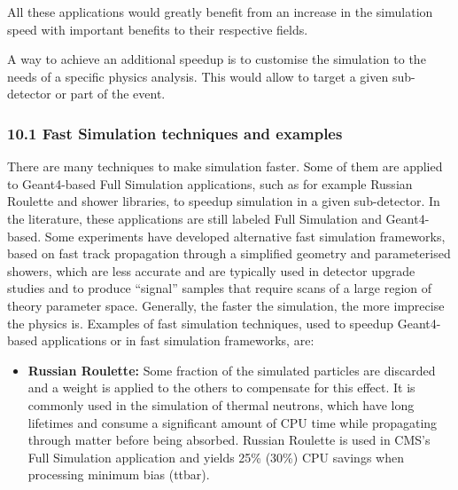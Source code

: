 \documentclass[12pt,a4paper]{article}
\begin{document}
All these applications would greatly benefit from an increase in the
simulation speed with important benefits to their respective fields.

A way to achieve an additional speedup is to customise the simulation to
the needs of a specific physics analysis. This would allow to target a
given sub-detector or part of the event.

\hypertarget{fast-simulation-techniques-and-examples}{%
\subsubsection{10.1 Fast Simulation techniques and
examples}\label{fast-simulation-techniques-and-examples}}

There are many techniques to make simulation faster. Some of them are
applied to Geant4-based Full Simulation applications, such as for
example Russian Roulette and shower libraries, to speedup simulation in
a given sub-detector. In the literature, these applications are still
labeled Full Simulation and Geant4-based. Some experiments have
developed alternative fast simulation frameworks, based on fast track
propagation through a simplified geometry and parameterised showers,
which are less accurate and are typically used in detector upgrade
studies and to produce ``signal'' samples that require scans of a large
region of theory parameter space. Generally, the faster the simulation,
the more imprecise the physics is. Examples of fast simulation
techniques, used to speedup Geant4-based applications or in fast
simulation frameworks, are:

\begin{itemize}
\item
  \textbf{Russian Roulette:} Some fraction of the simulated particles
  are discarded and a weight is applied to the others to compensate for
  this effect. It is commonly used in the simulation of thermal
  neutrons, which have long lifetimes and consume a significant amount
  of CPU time while propagating through matter before being absorbed.
  Russian Roulette is used in CMS's Full Simulation application and
  yields 25\% (30\%) CPU savings when processing minimum bias (ttbar).
\end{itemize}
\end{document}
